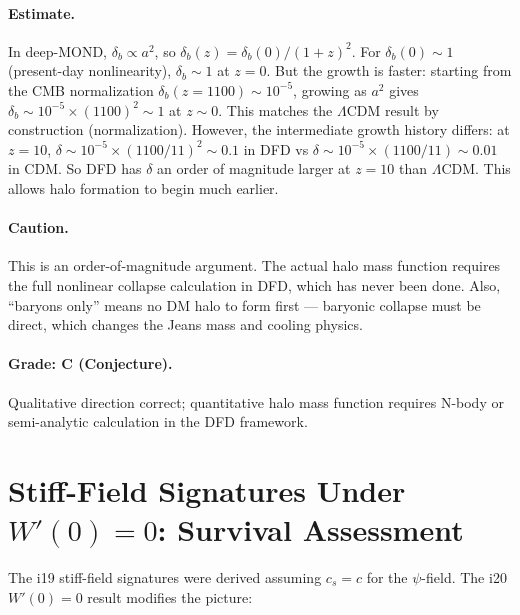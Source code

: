 \documentclass[11pt]{article}
\newcommand{\LCDM}{$\Lambda$CDM}
\begin{document}
\paragraph{Estimate.}  In deep-MOND, $\delta_b \propto a^2$, so
$\delta_b(z) = \delta_b(0)/(1+z)^2$.  For $\delta_b(0) \sim 1$
(present-day nonlinearity), $\delta_b \sim 1$ at $z = 0$.  But the
growth is faster: starting from the CMB normalization
$\delta_b(z=1100) \sim 10^{-5}$, growing as $a^2$ gives
$\delta_b \sim 10^{-5} \times (1100)^2 \sim 1$ at $z \sim 0$.
This matches the \LCDM{} result by construction (normalization).
However, the intermediate growth history differs: at $z = 10$,
$\delta \sim 10^{-5} \times (1100/11)^2 \sim 0.1$ in DFD vs
$\delta \sim 10^{-5} \times (1100/11) \sim 0.01$ in CDM.  So DFD
has $\delta$ an order of magnitude larger at $z = 10$ than \LCDM.
This allows halo formation to begin much earlier.

\paragraph{Caution.}  This is an order-of-magnitude argument.
The actual halo mass function requires the full nonlinear collapse
calculation in DFD, which has never been done.  Also, ``baryons only''
means no DM halo to form first --- baryonic collapse must be direct,
which changes the Jeans mass and cooling physics.

\paragraph{Grade: C (Conjecture).}  Qualitative direction correct;
quantitative halo mass function requires N-body or semi-analytic
calculation in the DFD framework.


\section{Stiff-Field Signatures Under $W'(0)=0$: Survival Assessment}
\label{sec:stiff}

The i19 stiff-field signatures were derived assuming $c_s = c$ for the
$\psi$-field.  The i20 $W'(0) = 0$ result modifies the picture:
\end{document}
